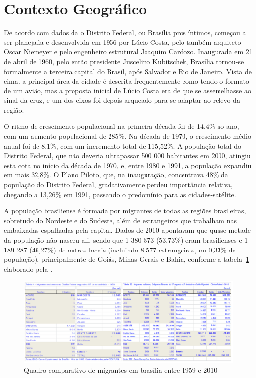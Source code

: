\section{Contexto Geográfico}

De acordo com dados da  o Distrito Federal, ou Brasília pros íntimos, começou a ser planejada e desenvolvida em 1956 por Lúcio Costa, pelo também arquiteto Oscar Niemeyer e pelo engenheiro estrutural Joaquim Cardozo. Inaugurada em 21 de abril de 1960, pelo então presidente Juscelino Kubitschek, Brasília tornou-se formalmente a terceira capital do Brasil, após Salvador e Rio de Janeiro. Vista de cima, a principal área da cidade é descrita frequentemente como tendo o formato de um avião, mas a proposta inicial de Lúcio Costa era de que se assemelhasse ao sinal da cruz, e um dos eixos foi depois arqueado para se adaptar ao relevo da região.

O ritmo de crescimento populacional na primeira década foi de 14,4\% ao ano, com um aumento populacional de 285\%. Na década de 1970, o crescimento médio anual foi de 8,1\%, com um incremento total de 115,52\%. A população total do Distrito Federal, que não deveria ultrapassar 500 000 habitantes em 2000, atingiu esta cota no início da década de 1970, e, entre 1980 e 1991, a população expandiu em mais 32,8\%. O Plano Piloto, que, na inauguração, concentrava 48\% da população do Distrito Federal, gradativamente perdeu importância relativa, chegando a 13,26\% em 1991, passando o predomínio para as cidades-satélite.


A população brasiliense é formada por migrantes de todas as regiões brasileiras, sobretudo do Nordeste e do Sudeste, além de estrangeiros que trabalham nas embaixadas espalhadas pela capital. Dados de 2010 apontavam que quase metade da população não nasceu ali, sendo que 1 380 873 (53,73\%) eram brasilienses e 1 189 287 (46,27\%) de outros locais (incluindo 8 577 estrangeiros, ou 0,33\% da população), principalmente de Goiás, Minas Gerais e Bahia, conforme a tabela~\ref*{table:migrantes-1959-2010} elaborado pela .

\begin{figure}[h!]
    \centering
    \includegraphics[width=0.95\linewidth]{fig/migrantes-1959-2010}
    \caption[]{Quadro comparativo de migrantes em brasília entre 1959 e 2010}
    \label{table:migrantes-1959-2010}
\end{figure}


